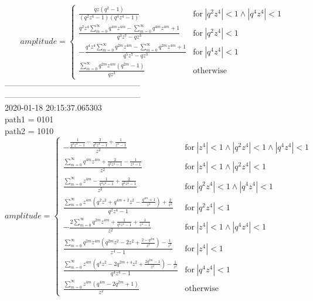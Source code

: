 $$amplitude = \begin{cases} \frac{q z \left(q^{2} - 1\right)}{\left(q^{2} z^{4} - 1\right) \left(q^{4} z^{4} - 1\right)} & \text{for}\: \left|{q^{2} z^{4}}\right| < 1 \wedge \left|{q^{4} z^{4}}\right| < 1 \\\frac{q^{2} z^{4} \sum_{m=0}^{\infty} q^{4 m} z^{4 m} - \sum_{m=0}^{\infty} q^{4 m} z^{4 m} + 1}{q^{3} z^{7} - q z^{3}} & \text{for}\: \left|{q^{2} z^{4}}\right| < 1 \\- \frac{q^{4} z^{4} \sum_{m=0}^{\infty} q^{2 m} z^{4 m} - \sum_{m=0}^{\infty} q^{2 m} z^{4 m} + 1}{q^{5} z^{7} - q z^{3}} & \text{for}\: \left|{q^{4} z^{4}}\right| < 1 \\\frac{\sum_{m=0}^{\infty} q^{2 m} z^{4 m} \left(q^{2 m} - 1\right)}{q z^{3}} & \text{otherwise} \end{cases}$$
--------------------------------------------------\\
--------------------------------------------------\\
2020-01-18 20:15:37.065303\\
path1 = 0101\\
path2 = 1010\\
$$amplitude = \begin{cases} - \frac{\frac{1}{q^{4} z^{4} - 1} - \frac{2}{q^{2} z^{4} - 1} + \frac{1}{z^{4} - 1}}{z^{2}} & \text{for}\: \left|{z^{4}}\right| < 1 \wedge \left|{q^{2} z^{4}}\right| < 1 \wedge \left|{q^{4} z^{4}}\right| < 1 \\\frac{\sum_{m=0}^{\infty} q^{4 m} z^{4 m} + \frac{2}{q^{2} z^{4} - 1} - \frac{1}{z^{4} - 1}}{z^{2}} & \text{for}\: \left|{z^{4}}\right| < 1 \wedge \left|{q^{2} z^{4}}\right| < 1 \\\frac{\sum_{m=0}^{\infty} z^{4 m} - \frac{1}{q^{4} z^{4} - 1} + \frac{2}{q^{2} z^{4} - 1}}{z^{2}} & \text{for}\: \left|{q^{2} z^{4}}\right| < 1 \wedge \left|{q^{4} z^{4}}\right| < 1 \\\frac{\sum_{m=0}^{\infty} z^{4 m} \left(q^{2} z^{2} + q^{4 m + 2} z^{2} - \frac{q^{4 m} + 1}{z^{2}}\right) + \frac{2}{z^{2}}}{q^{2} z^{4} - 1} & \text{for}\: \left|{q^{2} z^{4}}\right| < 1 \\- \frac{2 \sum_{m=0}^{\infty} q^{2 m} z^{4 m} + \frac{1}{q^{4} z^{4} - 1} + \frac{1}{z^{4} - 1}}{z^{2}} & \text{for}\: \left|{z^{4}}\right| < 1 \wedge \left|{q^{4} z^{4}}\right| < 1 \\\frac{\sum_{m=0}^{\infty} q^{2 m} z^{4 m} \left(q^{2 m} z^{2} - 2 z^{2} + \frac{2 - q^{2 m}}{z^{2}}\right) - \frac{1}{z^{2}}}{z^{4} - 1} & \text{for}\: \left|{z^{4}}\right| < 1 \\\frac{\sum_{m=0}^{\infty} z^{4 m} \left(q^{4} z^{2} - 2 q^{2 m + 4} z^{2} + \frac{2 q^{2 m} - 1}{z^{2}}\right) - \frac{1}{z^{2}}}{q^{4} z^{4} - 1} & \text{for}\: \left|{q^{4} z^{4}}\right| < 1 \\\frac{\sum_{m=0}^{\infty} z^{4 m} \left(q^{4 m} - 2 q^{2 m} + 1\right)}{z^{2}} & \text{otherwise} \end{cases}$$
